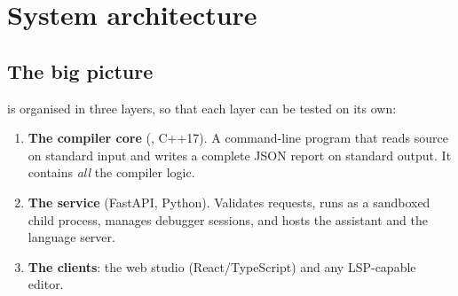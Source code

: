 \chapter{System architecture}
\label{ch:arch}

\section{The big picture}
\nova{} is organised in three layers, so that each layer can be tested on its own:

\begin{enumerate}
  \item \textbf{The compiler core} (, C++17). A command-line program that reads source on standard input and writes a complete JSON report on standard output. It contains \emph{all} the compiler logic.
  \item \textbf{The service} (FastAPI, Python). Validates requests, runs  as a sandboxed child process, manages debugger sessions, and hosts the assistant and the language server.
  \item \textbf{The clients}: the web studio (React/TypeScript) and any LSP-capable editor.
\end{enumerate}

